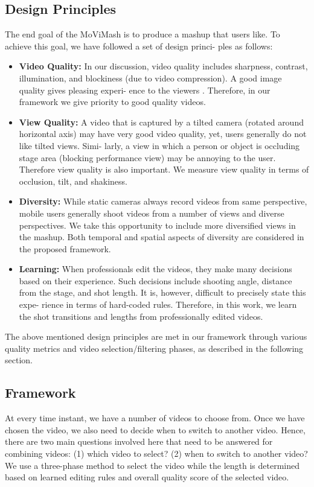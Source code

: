 \documentclass{sig-alternate}
\begin{document}
\subsection{Design Principles}
The end goal of the MoViMash is to produce a mashup that users
like. To achieve this goal, we have followed a set of design princi-
ples as follows:
\begin{itemize}
\item \textbf{Video Quality:} In our discussion, video quality includes
sharpness, contrast, illumination, and blockiness (due to video
compression). A good image quality gives pleasing experi-
ence to the viewers \cite{salas:ten}. Therefore, in our framework we
give priority to good quality videos.
\item \textbf{View Quality:} A video that is captured by a tilted camera
(rotated around horizontal axis) may have very good video
quality, yet, users generally do not like tilted views. Simi-
larly, a view in which a person or object is occluding stage
area (blocking performance view) may be annoying to the
user. Therefore view quality is also important. We measure
view quality in terms of occlusion, tilt, and shakiness.
\item \textbf{Diversity:} While static cameras always record videos from
same perspective, mobile users generally shoot videos from
a number of views and diverse perspectives. We take this
opportunity to include more diversified views in the mashup.
Both temporal and spatial aspects of diversity are considered
in the proposed framework.
\item \textbf{Learning:} When professionals edit the videos, they make
many decisions based on their experience. Such decisions
include shooting angle, distance from the stage, and shot
length. It is, however, difficult to precisely state this expe-
rience in terms of hard-coded rules. Therefore, in this work,
we learn the shot transitions and lengths from professionally
edited videos.
\end{itemize}

The above mentioned design principles are met in our framework
through various quality metrics and video selection/filtering phases,
as described in the following section.

\subsection{Framework}
At every time instant, we have a number of videos to choose
from. Once we have chosen the video, we also need to decide when
to switch to another video. Hence, there are two main questions
involved here that need to be answered for combining videos: (1)
which video to select? (2) when to switch to another video? We
use a three-phase method to select the video while the length is
determined based on learned editing rules and overall quality score
of the selected video.
\end{document}
